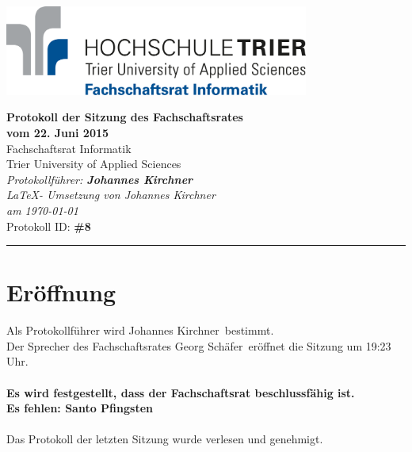 \documentclass[a4paper, 11pt]{article} %
\newcounter{summe}
\newcommand{\abstimmung}[4]{
	\setcounter{summe}{#3}
	\addtocounter{summe}{#4}
	\begin{flushleft}
		#1\\
	Es wird über den Antrag abgestimmt.
	\end{flushleft}
	\ifthenelse{\equal{#3}{0}\AND\equal{#4}{0}}{
	\begin{center}
		\textbf{Der Antrag wird einstimmig angenommen.}
	\end{center}
	}{
	\begin{center}
		#2 \ifthenelse{\equal{#2}{1}}{Stimme}{Stimmen} dafür, #3 \ifthenelse{\equal{#3}{1}}{Stimme}{Stimmen} dagegen, #4 \ifthenelse{\equal{#42}{1}}{Enthaltung}{Enthaltungen}\\
		\ifthenelse{#2>\value{summe}}{
		\textbf{Der Antrag ist somit angenommen.}
		}{
		\textbf{Der Antrag ist somit abgelehnt.}
		}
	\end{center}
	}
}
\newcommand{\protokoller}{Johannes Kirchner}
\newcommand{\dateOfMeeting}{22. Juni 2015}
\newcommand{\TeXer}{Johannes Kirchner}
\newcommand{\fsiPresident}{Georg Schäfer}
\newcommand{\protocolID}{8}
\begin{document}

\doublespacing
\thispagestyle{empty}

\begin{center}
\includegraphics[width=10.0cm]{../logo_fsi.eps}

\vspace*{\fill}
{\LARGE \textbf{Protokoll der Sitzung des Fachschaftsrates \\vom \dateOfMeeting}}\\
Fachschaftsrat Informatik\\
Trier University of Applied Sciences\\
\vspace{2.5cm}
\textit{
	Protokollführer: \textbf{\protokoller} \\
	\LaTeX - Umsetzung von \TeXer\\
	am \today\\
}
Protokoll ID: \textbf{\#\protocolID}
\vfill
\end{center}

\hspace*{-35cm}
\textcolor{fsi}{\rule{64.9cm}{15pt}}
\pagebreak

\setcounter{tocdepth}{2}
\tableofcontents
\pagebreak

\section{Eröffnung}
Als Protokollführer wird \protokoller~bestimmt.\\
Der Sprecher des Fachschaftsrates \fsiPresident~eröffnet die Sitzung um 19:23 Uhr.
\\\\
\textbf{Es wird festgestellt, dass der Fachschaftsrat beschlussfähig ist.}\\
\textbf{Es fehlen: Santo Pfingsten}
\\\\
Das Protokoll der letzten Sitzung wurde verlesen und genehmigt.

\end{document}
